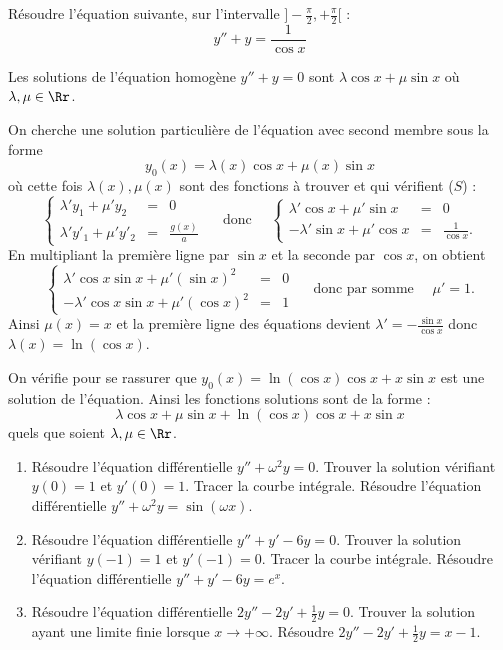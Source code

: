 \documentclass[class=report,crop=false]{standalone}
\begin{document}
\begin{exemple}
Résoudre l'équation suivante, sur l'intervalle $]-\frac\pi2,+\frac\pi2[$ :
$$y'' + y = \frac{1}{\cos x}$$

Les solutions de l'équation homogène $y'' + y =0$ sont
$\lambda \cos x  + \mu \sin x$ où $\lambda,\mu\in\Rr$.

On cherche une solution particulière de l'équation avec second membre sous la forme
$$y_0(x) =\lambda(x) \cos x  + \mu(x) \sin x$$
où cette fois $\lambda(x),\mu(x)$ sont des fonctions à trouver et qui vérifient ($S$) :
$$
\left\{\begin{array}{ccl}
\lambda'y_1+\mu'y_2&=&0\\
\lambda'y'_1+\mu'y'_2&=& \frac{g(x)}{a}
\end{array}\right.
\quad \text{ donc } \quad
\left\{\begin{array}{ccl}
\lambda' \cos x + \mu' \sin x &=&0\\
-\lambda' \sin x + \mu' \cos x &=& \frac{1}{\cos x}.
\end{array}\right.
$$
En multipliant la première ligne par $\sin x$ et la seconde par $\cos x$, on obtient
$$
\left\{\begin{array}{ccl}
\lambda' \cos x \sin x + \mu' (\sin x)^2 &=&0\\
-\lambda' \cos x \sin x + \mu' (\cos x)^2 &=& 1
\end{array}\right.
\quad \text{ donc par somme } \quad
\mu'=1.
$$
Ainsi $\mu(x) = x$ et la première ligne des équations devient
$\lambda' = -\frac{\sin x}{\cos x}$ donc $\lambda(x) = \ln(\cos x)$.

On vérifie pour se rassurer que $y_0(x) = \ln(\cos x) \cos x + x\sin x$ est une solution
de l'équation. Ainsi les fonctions solutions sont de la forme :
$$\lambda \cos x  + \mu \sin x + \ln(\cos x) \cos x + x\sin x$$
quels que soient $\lambda,\mu\in \Rr$.

\end{exemple}


\begin{miniexercices}
\sauteligne
\begin{enumerate}
  \item Résoudre l'équation différentielle $y'' + \omega^2y=0$.
  Trouver la solution vérifiant $y(0)=1$ et $y'(0)=1$.
  Tracer la courbe intégrale.
  Résoudre l'équation différentielle $y'' + \omega^2y= \sin(\omega x)$.

  \item Résoudre l'équation différentielle $y'' + y' -6y=0$.
  Trouver la solution vérifiant $y(-1)=1$ et $y'(-1)=0$.
  Tracer la courbe intégrale.
  Résoudre l'équation différentielle $y'' + y' -6y= e^x$.

  \item Résoudre l'équation différentielle $2y'' -2 y' +\frac12 y=0$.
  Trouver la solution ayant une limite finie lorsque $x\to +\infty$.
  Résoudre $2y'' -2 y' +\frac12 y=x-1$.
\end{enumerate}
\end{miniexercices}
\end{document}
